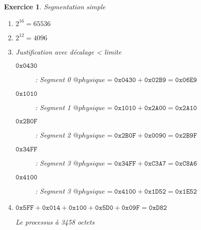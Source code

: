 \documentclass{article}
\theoremstyle{plain}
\newtheorem{exo}{Exercice}%
\begin{document}
\begin{exo} Segmentation simple
\begin{enumerate}
    \item $2^{16}=65 536$
    \item $2^{12}=4096$
    \item Justification avec décalage < limite
    \begin{description}
        \item[$\mathtt{0x0430}$]: Segment 0 $@physique = \mathtt{0x0430} + \mathtt{0x02B9} = \mathtt{0x06E9}$
        \item[$\mathtt{0x1010}$]: Segment 1 $@physique = \mathtt{0x1010} + \mathtt{0x2A00} = \mathtt{0x2A10}$
        \item[$\mathtt{0x2B0F}$]: Segment 2 $@physique = \mathtt{0x2B0F} + \mathtt{0x0090} = \mathtt{0x2B9F}$
        \item[$\mathtt{0x34FF}$]: Segment 3 $@physique = \mathtt{0x34FF} + \mathtt{0xC3A7} = \mathtt{0xC8A6}$
        \item[$\mathtt{0x4100}$]: Segment 3 $@physique = \mathtt{0x4100} + \mathtt{0x1D52} = \mathtt{0x1E52}$
    \end{description}
    \item $\mathtt{0x5FF} + \mathtt{0x014} + \mathtt{0x100} + \mathtt{0x5D0} + \mathtt{0x09F} = \mathtt{0xD82}$

    Le processus à 3458 octets
\end{enumerate}
\end{exo}
\end{document}
